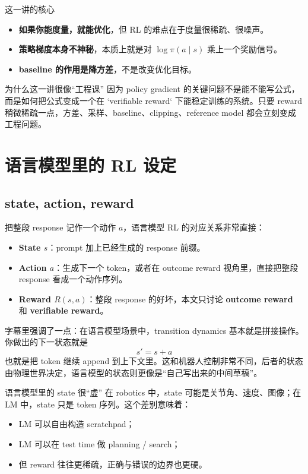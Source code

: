 \documentclass[a4paper]{article}
\begin{document}
\begin{importantbox}{这一讲的核心}
\begin{itemize}
    \item \textbf{如果你能度量，就能优化}，但 RL 的难点在于度量很稀疏、很噪声。
    \item \textbf{策略梯度本身不神秘}，本质上就是对 $\log \pi(a \mid s)$ 乘上一个奖励信号。
    \item \textbf{baseline 的作用是降方差}，不是改变优化目标。
\end{itemize}
\end{importantbox}


\begin{knowledgebox}{为什么这一讲很像“工程课”}
因为 policy gradient 的关键问题不是能不能写公式，而是如何把公式变成一个在 `verifiable reward` 下能稳定训练的系统。只要 reward 稍微稀疏一点，方差、采样、baseline、clipping、reference model 都会立刻变成工程问题。
\end{knowledgebox}

\section{语言模型里的 RL 设定}

\subsection{state, action, reward}

把整段 response 记作一个动作 $a$，语言模型 RL 的对应关系非常直接：
\begin{itemize}
    \item \textbf{State $s$}：prompt 加上已经生成的 response 前缀。
    \item \textbf{Action $a$}：生成下一个 token，或者在 outcome reward 视角里，直接把整段 response 看成一个动作序列。
    \item \textbf{Reward $R(s,a)$}：整段 response 的好坏，本文只讨论 \textbf{outcome reward} 和 \textbf{verifiable reward}。
\end{itemize}

字幕里强调了一点：在语言模型场景中，transition dynamics 基本就是拼接操作。你做出的下一状态就是
\[
s' = s + a
\]
也就是把 token 继续 append 到上下文里。这和机器人控制非常不同，后者的状态由物理世界决定，语言模型的状态则更像是“自己写出来的中间草稿”。

\begin{knowledgebox}{语言模型里的 state 很“虚”}
在 robotics 中，state 可能是关节角、速度、图像；在 LM 中，state 只是 token 序列。这个差别意味着：
\begin{itemize}
    \item LM 可以自由构造 scratchpad；
    \item LM 可以在 test time 做 planning / search；
    \item 但 reward 往往更稀疏，正确与错误的边界也更硬。
\end{itemize}
\end{knowledgebox}
\end{document}
